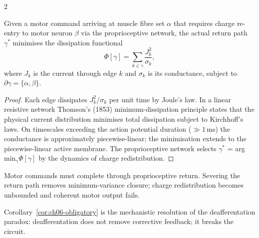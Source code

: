 \begin{multicols}{2}
\begin{theorem}
\label{thm:ch06-minvar}
Given a motor command arriving at muscle fibre set $\alpha$ that requires
charge re-entry to motor neuron $\beta$ via the proprioceptive network, the
actual return path $\gamma^*$ minimises the dissipation functional
\begin{equation}
  \Phi[\gamma] = \sum_{k\in\gamma} \frac{J_k^2}{\sigma_k},
  \label{eq:ch06-dissipation}
\end{equation}
where $J_k$ is the current through edge $k$ and $\sigma_k$ is its conductance,
subject to $\partial\gamma = \{\alpha,\beta\}$.
\end{theorem}

\begin{proof}
Each edge dissipates $J_k^2/\sigma_k$ per unit time by Joule's law.  In a
linear resistive network Thomson's (1853) minimum-dissipation principle states
that the physical current distribution minimises total dissipation subject to
Kirchhoff's laws.  On timescales exceeding the action potential duration
($\gg 1$\,ms) the conductance is approximately piecewise-linear; the
minimisation extends to the piecewise-linear active membrane.  The proprioceptive
network selects $\gamma^*$ = arg\,min$_\gamma \Phi[\gamma]$ by the dynamics
of charge redistribution.
\end{proof}

\begin{corollary}
\label{cor:ch06-obligatory}
Motor commands must complete through proprioceptive return.  Severing the
return path removes minimum-variance closure; charge redistribution becomes
unbounded and coherent motor output fails.
\end{corollary}

Corollary~\ref{cor:ch06-obligatory} is the mechanistic resolution of the
deafferentation paradox: deafferentation does not remove corrective feedback;
it breaks the circuit.

\end{multicols}

